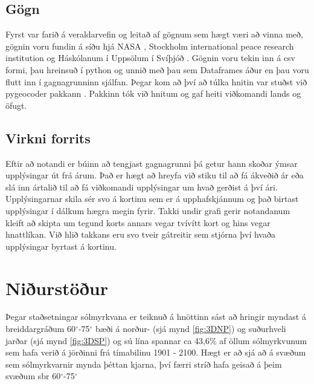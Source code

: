 \documentclass[12pt, git, final]{rureport}
\begin{document}

\subsection{Gögn}
Fyrst var farið á veraldarvefin og leitað af gögnum sem hægt væri að vinna með, gögnin voru fundin á síðu hjá NASA \cite{Eclipse}, Stockholm international peace research institution \cite{weapon} og Háskólanum í Uppsölum í Svíþjóð \cite{conflict}. Gögnin voru tekin inn á csv formi, þau hreinsuð í python og unnið með þau sem Dataframes áður en þau voru flutt inn í gagnagrunninn sjálfan. Þegar kom að því að túlka hnitin var stuðst við pygeocoder pakkann \cite{geocoder}. Pakkinn tók við hnitum og gaf heiti viðkomandi lands og öfugt.





\subsection{Virkni forrits}\label{virkni}
Eftir að notandi er búinn að tengjast gagnagrunni þá getur hann skoðar ýmsar upplýsingar út frá árum. Það er hægt að hreyfa við stiku til að fá ákveðið ár eða slá inn ártalið til að fá viðkomandi upplýsingar um hvað gerðist á því ári. Upplýsingarnar skila sér svo á kortinu sem er á upphafskjánnum og það birtast upplýsingar í dálkum hægra megin fyrir. Takki undir grafi gerir notandanum kleift að skipta um tegund korts annars vegar tvívítt kort og hins vegar hnattlíkan. Við hlið takkans eru svo tveir gátreitir sem stjórna því hvaða upplýsingar byrtast á kortinu.


\section{Niðurstöður}\label{nidurstodur}

Þegar staðsetningar sólmyrkvana er teiknuð á hnöttinn sást að hringir myndast á breiddargráðum 60$^{\circ}$-75$^{\circ}$ bæði á norður- (sjá mynd \ref{fig:3DNP}) og suðurhveli jarðar (sjá mynd \ref{fig:3DSP}) og sú lína spannar ca 43,6\% af öllum sólmyrkvunum sem hafa verið á jörðinni frá tímabilinu 1901 - 2100. Hægt er að sjá að á svæðum sem sólmyrkvarnir mynda þéttan kjarna, því færri stríð hafa geisað á þeim svæðum sbr 60$^{\circ}$-75$^{\circ}$
\pagebreak
\end{document}
